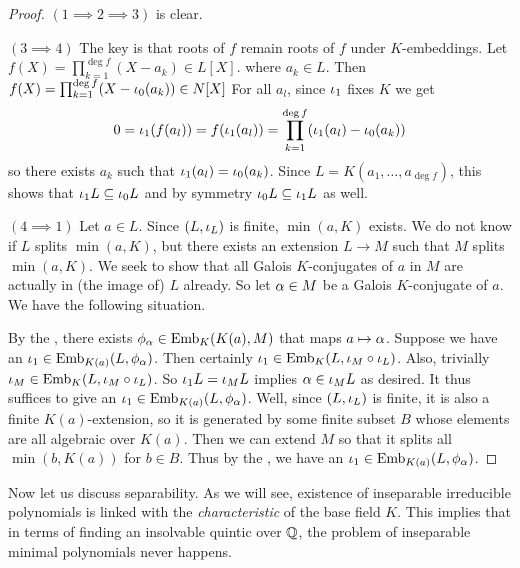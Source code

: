 \documentclass{article}
\begin{document}
\begin{proof} $(1 \implies 2 \implies 3)$ is clear. 

  $(3 \implies 4)$ The key is that roots of $f$ remain roots of $f$
  under $K$-embeddings. 
  Let $f(X) = \prod_{k = 1}^{\deg f} (X - a_k) \in L[X]$.
  where $a_k \in L$.
  Then $f(X) = \prod_{k = 1}^{\deg f} (X - \iota_0(a_k)) \in N[X]$
  For all $a_l$, since $\iota_1$ fixes $K$ we get
  \[
    0 = \iota_1(f(a_l)) = f(\iota_1(a_l))
    = \prod_{k = 1}^{\deg f} (\iota_1(a_l) - \iota_0(a_k))
  \]
  so there exists $a_k$ such that $\iota_1(a_l) = \iota_0(a_k)$.
  Since $L = K(a_1,\dots,a_{\deg f})$, 
  this shows that $\iota_1 L \subseteq \iota_0 L$
  and by symmetry $\iota_0 L \subseteq \iota_1 L$ as well. 

  $(4 \implies 1)$ Let $a \in L$. 
  Since $(L,\iota_L)$ is finite, $\min(a,K)$ exists.
  We do not know if $L$ splits $\min(a,K)$,
  but there exists an extension $L \to M$ such that 
  $M$ splits $\min(a,K)$.
  We seek to show that all Galois $K$-conjugates of $a$ in $M$ 
  are actually in (the image of) $L$ already.
  So let $\alpha \in M$ be a Galois $K$-conjugate of $a$. 
  We have the following situation. 
  \begin{figure} [H]
    \centering
  \end{figure}
  By the , 
  there exists $\phi_\alpha \in \mathrm{Emb}_{K}(K(a), M)$
  that maps $a \mapsto \alpha$. 
  Suppose we have an $\iota_1 \in \mathrm{Emb}_{K(a)}(L, \phi_\alpha)$.
  Then certainly $\iota_1 \in \mathrm{Emb}_{K}(L, \iota_M \circ \iota_L)$. 
  Also, trivially $\iota_M \in \mathrm{Emb}_{K}(L, \iota_M \circ \iota_L)$. 
  So $\iota_1 L = \iota_M L$ implies $\alpha \in \iota_M L$ as desired. 
  It thus suffices to give an $\iota_1 \in \mathrm{Emb}_{K(a)}(L, \phi_\alpha)$. 
  Well, since $(L,\iota_L)$ is finite, it is also a finite $K(a)$-extension, 
  so it is generated by some finite subset $B$
  whose elements are all algebraic over $K(a)$. 
  Then we can extend $M$ so that it splits all $\min(b,K(a))$ for $b \in B$. 
  Thus by the , 
  we have an $\iota_1 \in \mathrm{Emb}_{K(a)}(L, \phi_\alpha)$. 
\end{proof}

Now let us discuss separability.
As we will see,
existence of inseparable irreducible polynomials
is linked with the \emph{characteristic} of the base field $K$.
This implies that 
in terms of finding an insolvable quintic over $\mathbb{Q}$,
the problem of inseparable minimal polynomials never happens.
\end{document}
